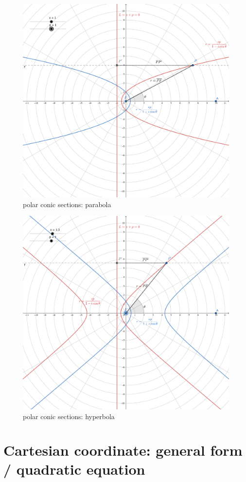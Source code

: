 \documentclass[
]{book}
\theoremstyle{definition}
\theoremstyle{definition}
\theoremstyle{definition}
\theoremstyle{definition}
\theoremstyle{remark}
\begin{document}
\begin{figure}
\includegraphics[width=0.75\linewidth]{img/conic-sections-polar-parabola} \caption{polar conic sections: parabola}\label{fig:unnamed-chunk-8}
\end{figure}

\begin{figure}
\includegraphics[width=0.75\linewidth]{img/conic-sections-polar-hyperbola} \caption{polar conic sections: hyperbola}\label{fig:unnamed-chunk-9}
\end{figure}

\section{Cartesian coordinate: general form / quadratic equation}\label{cartesian-coordinate-general-form-quadratic-equation}
\end{document}
